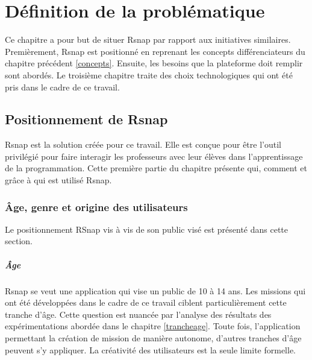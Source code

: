 \chapter{Définition de la problématique}
Ce chapitre a pour but de situer Rsnap par rapport aux initiatives similaires. Premièrement, Rsnap est positionné en reprenant les concepts différenciateurs du chapitre précédent \ref{concepts}. Ensuite, les besoins que la plateforme doit remplir sont abordés. Le troisième chapitre traite des choix technologiques qui ont été pris dans le cadre de ce travail.

\section{Positionnement de Rsnap}
\label{positionnement}
Rsnap est la solution créée pour ce travail. Elle est conçue pour être l'outil privilégié pour faire interagir les professeurs avec leur élèves dans l'apprentissage de la programmation.
Cette première partie du chapitre présente qui, comment et grâce à qui est utilisé Rsnap.


% 

\subsection{Âge, genre et origine des utilisateurs}
Le positionnement RSnap vis à vis de son public visé est présenté dans cette section.

\paragraph{Âge}
Rsnap se veut une application qui vise un public de 10 à 14 ans. Les missions qui ont été développées dans le cadre de ce travail ciblent particulièrement cette tranche d'âge. Cette question est nuancée par l'analyse des résultats des expérimentations abordée dans le chapitre \ref{trancheage}.
Toute fois, l'application permettant la création de mission de manière autonome, d'autres tranches d'âge peuvent s'y appliquer. La créativité des utilisateurs est la seule limite formelle.

